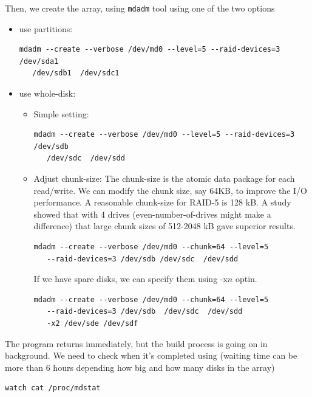 Then, we create the array, using \verb!mdadm! tool using one of the two options
\begin{itemize}
  \item use partitions:
\begin{verbatim}
mdadm --create --verbose /dev/md0 --level=5 --raid-devices=3 /dev/sda1 
   /dev/sdb1  /dev/sdc1 
\end{verbatim}
  
  \item use whole-disk:
  
  \begin{itemize}
    \item Simple setting:
\begin{verbatim}
mdadm --create --verbose /dev/md0 --level=5 --raid-devices=3 /dev/sdb 
   /dev/sdc  /dev/sdd
\end{verbatim}

     \item Adjust chunk-size:
The chunk-size is the atomic data package for each read/write.  We can modify
the chunk size, say 64KB, to improve the I/O performance.
A reasonable chunk-size for RAID-5 is 128 kB. A study showed that with 4 drives
(even-number-of-drives might make a difference) that large chunk sizes of
512-2048 kB gave superior results.
\begin{verbatim}
mdadm --create --verbose /dev/md0 --chunk=64 --level=5 
   --raid-devices=3 /dev/sdb /dev/sdc  /dev/sdd
\end{verbatim}
If we have spare disks, we can specify them using -x$n$ optin.
\begin{verbatim}
mdadm --create --verbose /dev/md0 --chunk=64 --level=5 
   --raid-devices=3 /dev/sdb  /dev/sdc  /dev/sdd 
   -x2 /dev/sde /dev/sdf
\end{verbatim}
     
   \end{itemize}
\end{itemize}

The program returns immediately, but the build process is going on in
background. We need to check when it's completed using (waiting time can be more
than 6 hours depending how big and how many disks in the array)
\begin{verbatim}
watch cat /proc/mdstat
\end{verbatim}

